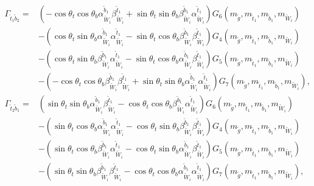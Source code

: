 \documentclass[final,3p,times,pdflatex]{elsarticle}
\begin{document}
\begin{equation}
\begin{aligned}
\Gamma_{\tilde{t}_1 \tilde{b}_2} = & (-\cos\theta_t \cos\theta_b \alpha_{\tilde{W}_i}^{\tilde{b}_1} \beta_{\tilde{W}_i}^{\tilde{t}_1} + \sin\theta_t \sin\theta_b \beta_{\tilde{W}_i}^{\tilde{b}_1} \alpha_{\tilde{W}_i}^{\tilde{t}_1})G_{6}(m_{\tilde{g}},m_{\tilde{t}_1},m_{\tilde{b}_1},m_{\tilde{W}_i}) \\ & - (\cos\theta_t \sin\theta_b \alpha_{\tilde{W}_i}^{\tilde{b}_1}\alpha_{\tilde{W}_i}^{\tilde{t}_1} - \sin\theta_t \cos\theta_b \beta_{\tilde{W}_i}^{\tilde{b}_1}\beta_{\tilde{W}_i}^{\tilde{t}_1}) G_{4}(m_{\tilde{g}},m_{\tilde{t}_1}, m_{\tilde{b}_1},m_{\tilde{W}_i}) \\ & - (\cos\theta_t \sin\theta_b \beta_{\tilde{W}_i}^{\tilde{b}_1} \alpha_{\tilde{W}_i}^{\tilde{t}_1} - \sin\theta_t \cos\theta_b \alpha_{\tilde{W}_i}^{\tilde{b}_1} \beta_{\tilde{W}_i}^{\tilde{t}_1})G_{5}(m_{\tilde{g}},m_{\tilde{t}_1}, m_{\tilde{b}_1}, m_{\tilde{W}_i}) \\ & - (-\cos\theta_t\cos\theta_b \beta_{\tilde{W}_i}^{\tilde{b}_1} \beta_{\tilde{W}_i}^{\tilde{t}_1} + \sin\theta_t \sin\theta_b \alpha_{\tilde{W}_i}^{\tilde{b}_1} \alpha_{\tilde{W}_i}^{\tilde{t}_1})G_{7}(m_{\tilde{g}},m_{\tilde{t}_1},m_{\tilde{b}_1},m_{\tilde{W}_i}),
\end{aligned}
\end{equation}
\begin{equation}
\begin{aligned}
\Gamma_{\tilde{t}_2 \tilde{b}_1} = & (\sin\theta_t \sin\theta_b \alpha_{\tilde{W}_i}^{\tilde{b}_1} \beta_{\tilde{W}_i}^{\tilde{t}_1} - \cos\theta_t \cos\theta_b \beta_{\tilde{W}_i}^{\tilde{b}_1} \alpha_{\tilde{W}_i}^{\tilde{t}_1})G_{6}(m_{\tilde{g}},m_{\tilde{t}_1},m_{\tilde{b}_1},m_{\tilde{W}_i}) \\ & - (\sin\theta_t \cos\theta_b \alpha_{\tilde{W}_i}^{\tilde{b}_1}\alpha_{\tilde{W}_i}^{\tilde{t}_1} - \cos\theta_t \sin\theta_b \beta_{\tilde{W}_i}^{\tilde{b}_1}\beta_{\tilde{W}_i}^{\tilde{t}_1}) G_{4}(m_{\tilde{g}},m_{\tilde{t}_1}, m_{\tilde{b}_1},m_{\tilde{W}_i}) \\ & - (\sin\theta_t \cos\theta_b \beta_{\tilde{W}_i}^{\tilde{b}_1} \alpha_{\tilde{W}_i}^{\tilde{t}_1} - \cos\theta_t \sin\theta_b \alpha_{\tilde{W}_i}^{\tilde{b}_1} \beta_{\tilde{W}_i}^{\tilde{t}_1})G_{5}(m_{\tilde{g}},m_{\tilde{t}_1}, m_{\tilde{b}_1}, m_{\tilde{W}_i}) \\ & - (\sin\theta_t\sin\theta_b \beta_{\tilde{W}_i}^{\tilde{b}_1} \beta_{\tilde{W}_i}^{\tilde{t}_1} - \cos\theta_t \cos\theta_b \alpha_{\tilde{W}_i}^{\tilde{b}_1} \alpha_{\tilde{W}_i}^{\tilde{t}_1})G_{7}(m_{\tilde{g}},m_{\tilde{t}_1},m_{\tilde{b}_1},m_{\tilde{W}_i}),
\end{aligned}
\end{equation}
\end{document}
